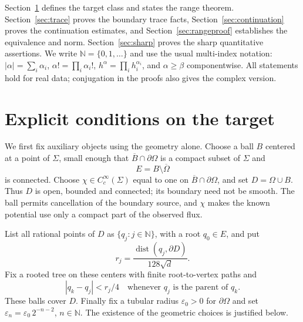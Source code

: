 \documentclass[11pt]{article}
\theoremstyle{remark}
\newcommand{\N}{\mathbb N}
\newcommand{\Om}{\Omega}
\DeclareMathOperator{\dist}{dist}
\begin{document}
Section~\ref{sec:class} defines the target class and states the range theorem.
Section~\ref{sec:trace} proves the boundary trace facts,
Section~\ref{sec:continuation} proves the continuation estimates,
and Section~\ref{sec:rangeproof} establishes the equivalence and norm.
Section~\ref{sec:sharp} proves the sharp quantitative assertions.
We write $\N=\{0,1,\ldots\}$ and use the usual multi-index notation:
$|\alpha|=\sum_i\alpha_i$, $\alpha!=\prod_i\alpha_i!$,
$h^\alpha=\prod_i h_i^{\alpha_i}$, and $\alpha\geq\beta$ componentwise.
All statements hold for real data; conjugation in the proofs also gives the
complex version.

\section{Explicit conditions on the target}\label{sec:class}

We first fix auxiliary objects using the geometry alone.
Choose a ball $B$ centered at a point of $\Sigma$, small enough that
$\overline B\cap\partial\Om$ is a compact subset of $\Sigma$ and
\[
 E=B\setminus\overline\Om
\]
is connected. Choose $\chi\in C^\infty_c(\Sigma)$ equal to one on
$\overline B\cap\partial\Om$, and set $D=\Om\cup B$.
Thus $D$ is open, bounded and connected; its boundary need not be smooth.
The ball permits cancellation of the boundary source, and $\chi$ makes
the known potential use only a compact part of the observed flux.

List all rational points of $D$ as $\{q_j:j\in\N\}$, with a root
$q_0\in E$, and put
\begin{equation}\label{eq:radii}
 r_j=\frac{\dist(q_j,\partial D)}{128\sqrt d}.
\end{equation}
Fix a rooted tree on these centers with finite root-to-vertex paths and
\begin{equation}\label{eq:edges}
 |q_k-q_j|<r_j/4
 \quad\text{whenever $q_j$ is the parent of $q_k$.}
\end{equation}
These balls cover $D$. Finally fix a tubular radius $\varepsilon_0>0$
for $\partial\Om$ and set
$\varepsilon_n=\varepsilon_0\,2^{-n-2}$, $n\in\N$.
The existence of the geometric choices is justified below.
\end{document}
